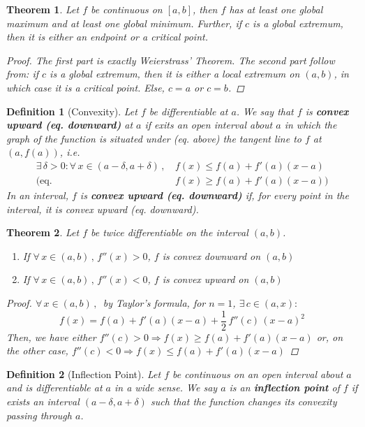 \documentclass[12pt]{article}
\let\RA\Rightarrow
\newcommand{\Forall}[1]{\forall\,{#1}\,,\,}
\newcommand{\Exist}[1]{\exists\,{#1}:}
\newtheorem{theorem}{Theorem}[subsection]
\newtheorem{definition}{Definition}[subsection]
\begin{document}
\begin{theorem}
  Let $f$ be continuous on $[a,b]$, then $f$ has at least one global maximum and at least one global minimum. Further, if $c$ is a global extremum, then it is either an endpoint or a critical point.
  \begin{proof}
    The first part is exactly Weierstrass' Theorem. The second part follow from: if $c$ is a global extremum, then it is either a local extremum on $(a,b)$, in which case it is a critical point. Else, $c=a$ or $c=b$.
  \end{proof}
\end{theorem}

\begin{definition}[Convexity]
  Let $f$ be differentiable at $a$. We say that $f$ is \textbf{convex upward (eq. downward)} at $a$ if exits an open interval about $a$ in which the graph of the function is situated under (eq. above) the tangent line to $f$ at $(a,f(a))$, i.e. 
  \begin{align*}
    \Exist{\delta>0}\Forall{x\in (a-\delta,a+\delta)} &f(x)\leq f(a)+f'(a)(x-a)\\
    \bigg(\text{eq. }&f(x)\geq f(a)+f'(a)(x-a)\bigg)
  \end{align*}
  In an interval, $f$ is \textbf{convex upward (eq. downward)} if, for every point in the interval, it is convex upward (eq. downward).
\end{definition}

\begin{theorem}
  Let $f$ be twice differentiable on the interval $(a,b)$.
  \begin{enumerate}
    \item If $\Forall{x\in(a,b)} f''(x)>0$, $f$ is convex downward on $(a,b)$
    \item If $\Forall{x\in(a,b)} f''(x)<0$, $f$ is convex upward on $(a,b)$
  \end{enumerate}
  \begin{proof}
    $\Forall{x\in(a,b)}$ by Taylor's formula, for $n=1$, $\Exist{c\in(a,x)}$
    $$f(x)=f(a)+f'(a)(x-a)+\frac{1}{2}\,f''(c)\,(x-a)^2$$
    Then, we have either $f''(c)>0\RA f(x)\geq f(a)+f'(a)(x-a)$ or, on the other case, $f''(c)<0\RA f(x)\leq f(a)+f'(a)(x-a)$
  \end{proof}
\end{theorem}

\begin{definition}[Inflection Point]
  Let $f$ be continuous on an open interval about $a$ and is differentiable at $a$ in a wide sense. We say $a$ is an \textbf{inflection point} of $f$ if exists an interval $(a-\delta,a+\delta)$ such that the function changes its convexity passing through $a$.
\end{definition}
\end{document}
